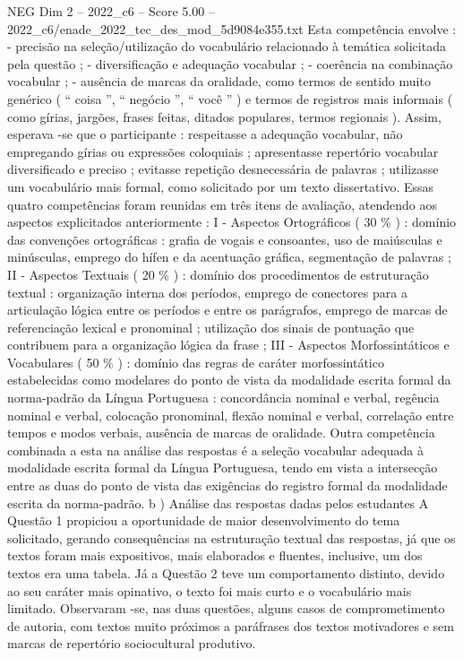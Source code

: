 \begin{textsample}{NEG Dim 2 – 2022\_c6 – Score 5.00 – 2022\_c6/enade\_2022\_tec\_des\_mod\_5d9084e355.txt}
Esta competência envolve : - precisão na seleção/utilização do vocabulário relacionado à temática solicitada pela questão ; - diversificação e adequação vocabular ; - coerência na combinação vocabular ; - ausência de marcas da oralidade, como termos de sentido muito genérico ( “ coisa ”, “ negócio ”, “ você ” ) e termos de registros mais informais ( como gírias, jargões, frases feitas, ditados populares, termos regionais ).
Assim, esperava -se que o participante : respeitasse a adequação vocabular, não empregando gírias ou expressões coloquiais ; apresentasse repertório vocabular diversificado e preciso ; evitasse repetição desnecessária de palavras ; utilizasse um vocabulário mais formal, como solicitado por um texto dissertativo.
Essas quatro competências foram reunidas em três itens de avaliação, atendendo aos aspectos explicitados anteriormente : I - Aspectos Ortográficos ( 30 \% ) : domínio das convenções ortográficas : grafia de vogais e consoantes, uso de maiúsculas e minúsculas, emprego do hífen e da acentuação gráfica, segmentação de palavras ; II - Aspectos Textuais ( 20 \% ) : domínio dos procedimentos de estruturação textual : organização interna dos períodos, emprego de conectores para a articulação lógica entre os períodos e entre os parágrafos, emprego de marcas de referenciação lexical e pronominal ; utilização dos sinais de pontuação que contribuem para a organização lógica da frase ; III - Aspectos Morfossintáticos e Vocabulares ( 50 \% ) : domínio das regras de caráter morfossintático estabelecidas como modelares do ponto de vista da modalidade escrita formal da norma-padrão da Língua Portuguesa : concordância nominal e verbal, regência nominal e verbal, colocação pronominal, flexão nominal e verbal, correlação entre tempos e modos verbais, ausência de marcas de oralidade.
Outra competência combinada a esta na análise das respostas é a seleção vocabular adequada à modalidade escrita formal da Língua Portuguesa, tendo em vista a intersecção entre as duas do ponto de vista das exigências do registro formal da modalidade escrita da norma-padrão. b ) Análise das respostas dadas pelos estudantes A Questão 1 propiciou a oportunidade de maior desenvolvimento do tema solicitado, gerando consequências na estruturação textual das respostas, já que os textos foram mais expositivos, mais elaborados e fluentes, inclusive, um dos textos era uma tabela.
Já a Questão 2 teve um comportamento distinto, devido ao seu caráter mais opinativo, o texto foi mais curto e o vocabulário mais limitado.
Observaram -se, nas duas questões, alguns casos de comprometimento de autoria, com textos muito próximos a paráfrases dos textos motivadores e sem marcas de repertório sociocultural produtivo.

\end{textsample}
